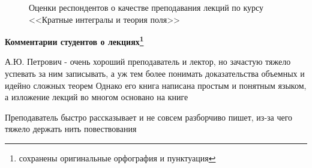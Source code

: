 \begin{figure}[H]
\begin{subfigure}[b]{0.45\textwidth}
			\end{subfigure}
			\caption{Оценки респондентов о качестве преподавания лекций по курсу <<Кратные интегралы и теория поля>>}
		\end{figure}

		\textbf{Комментарии студентов о лекциях\protect\footnote{сохранены оригинальные орфография и пунктуация}}
            \begin{commentbox} 
                А.Ю. Петрович - очень хороший преподаватель и лектор, но зачастую тяжело успевать за ним записывать, а уж тем более понимать доказательства объемных и идейно сложных теорем 
                Однако его книга написана простым и понятным языком, а изложение лекций во многом основано на книге 
            \end{commentbox} 
        
            \begin{commentbox} 
                Преподаватель быстро рассказывает и не совсем разборчиво пишет, из-за чего тяжело держать нить повествования 
            \end{commentbox} 
    
    
